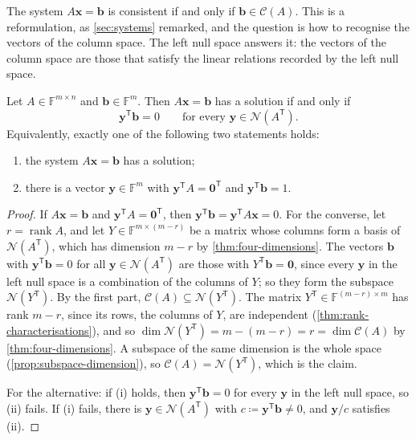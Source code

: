 The system $A\mathbf x=\mathbf b$ is consistent if and only if $\mathbf b\in\mathcal C(A)$. This is a reformulation, as \cref{sec:systems} remarked, and the question is how to recognise the vectors of the column space. The left null space answers it: the vectors of the column space are those that satisfy the linear relations recorded by the left null space.

\begin{theorem}
\label{thm:fredholm}
Let $A\in\mathbb F^{m\times n}$ and $\mathbf b\in\mathbb F^m$. Then $A\mathbf x=\mathbf b$ has a solution if and only if
\[
\mathbf y^{\mathsf T}\mathbf b=0\qquad\text{for every }\mathbf y\in\mathcal N(A^{\mathsf T}).
\]
Equivalently, exactly one of the following two statements holds:
\begin{enumerate}
\item the system $A\mathbf x=\mathbf b$ has a solution;
\item there is a vector $\mathbf y\in\mathbb F^m$ with $\mathbf y^{\mathsf T}A=\mathbf 0^{\mathsf T}$ and $\mathbf y^{\mathsf T}\mathbf b=1$.
\end{enumerate}
\end{theorem}

\begin{proof}
If $A\mathbf x=\mathbf b$ and $\mathbf y^{\mathsf T}A=\mathbf 0^{\mathsf T}$, then $\mathbf y^{\mathsf T}\mathbf b=\mathbf y^{\mathsf T}A\mathbf x=0$. For the converse, let $r=\operatorname{rank}A$, and let $Y\in\mathbb F^{m\times(m-r)}$ be a matrix whose columns form a basis of $\mathcal N(A^{\mathsf T})$, which has dimension $m-r$ by \cref{thm:four-dimensions}. The vectors $\mathbf b$ with $\mathbf y^{\mathsf T}\mathbf b=0$ for all $\mathbf y\in\mathcal N(A^{\mathsf T})$ are those with $Y^{\mathsf T}\mathbf b=\mathbf 0$, since every $\mathbf y$ in the left null space is a combination of the columns of $Y$; so they form the subspace $\mathcal N(Y^{\mathsf T})$. By the first part, $\mathcal C(A)\subseteq\mathcal N(Y^{\mathsf T})$. The matrix $Y^{\mathsf T}\in\mathbb F^{(m-r)\times m}$ has rank $m-r$, since its rows, the columns of $Y$, are independent (\cref{thm:rank-characterisations}), and so $\dim\mathcal N(Y^{\mathsf T})=m-(m-r)=r=\dim\mathcal C(A)$ by \cref{thm:four-dimensions}. A subspace of the same dimension is the whole space (\cref{prop:subspace-dimension}), so $\mathcal C(A)=\mathcal N(Y^{\mathsf T})$, which is the claim.

For the alternative: if (i) holds, then $\mathbf y^{\mathsf T}\mathbf b=0$ for every $\mathbf y$ in the left null space, so (ii) fails. If (i) fails, there is $\mathbf y\in\mathcal N(A^{\mathsf T})$ with $c\coloneqq\mathbf y^{\mathsf T}\mathbf b\ne0$, and $\mathbf y/c$ satisfies (ii).
\end{proof}

